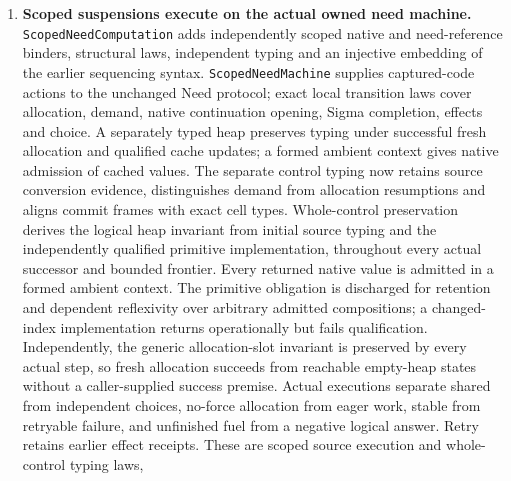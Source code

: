 \documentclass[11pt]{article}
\theoremstyle{definition}
\theoremstyle{remark}
\begin{document}
\begin{enumerate}
  The \nolinkurl{ScopedComputation} family independently constructs raw scoped
  syntax, formation-sensitive typing and direct ordered-world semantics.
  Typed substitution preserves every source constructor; interpretation
  commutes with source substitution and, under the primitive realization
  contract, exactly realizes the source worlds.
  Primitive result qualification implies native result typing for every
  admitted source program. Actual state/reflexivity operations discharge
  that condition for arbitrary admitted compositions. A changed-index
  primitive fails qualification despite realizing its own altered semantics.
  The finite non-aborting fragment has a result, but neither full CBPV
  progress nor normalization of its raw mathematical payloads follows.
\item \textbf{Scoped suspensions execute on the actual owned need machine.}
  \nolinkurl{ScopedNeedComputation} adds independently scoped native and
  need-reference binders, structural laws, independent typing and an
  injective embedding of the earlier sequencing syntax.
  \nolinkurl{ScopedNeedMachine} supplies captured-code actions to the
  unchanged Need protocol; exact local transition laws cover allocation,
  demand, native continuation opening, Sigma completion, effects and choice.
  A separately typed heap preserves typing under successful fresh allocation
  and qualified cache updates; a formed ambient context gives native
  admission of cached values. The separate control typing now retains source
  conversion evidence, distinguishes demand from allocation resumptions and
  aligns commit frames with exact cell types. Whole-control preservation
  derives the logical heap invariant from initial source typing and the
  independently qualified primitive implementation, throughout every actual
  successor and bounded frontier. Every returned native value is admitted
  in a formed ambient context. The primitive obligation is discharged for
  retention and dependent reflexivity over arbitrary admitted compositions;
  a changed-index implementation returns operationally but fails qualification.
  Independently, the generic allocation-slot invariant is preserved by
  every actual step, so fresh allocation succeeds from reachable empty-heap
  states without a caller-supplied success premise.
  Actual executions separate shared from independent choices,
  no-force allocation from eager work, stable from retryable failure, and
  unfinished fuel from a negative logical answer. Retry retains earlier
  effect receipts. These are scoped source execution and whole-control typing laws,

\end{enumerate}
\end{document}
